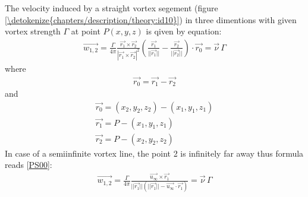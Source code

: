 \documentclass[a4paper,12pt,english]{jupyterBook}
\begin{document}
\sphinxAtStartPar
The velocity induced by a straight vortex segement (figure \hyperref[\detokenize{chapters/description/theory:id10}]{\ref{\detokenize{chapters/description/theory:id10}}}) in three dimentions with given vortex strength \(\Gamma\) at point \(P(x,y,z)\) is qiven by equation:
\begin{equation}\label{equation:chapters/description/theory:q_finite}
\begin{split}
\overrightarrow{w_{1,2}} = \frac{\Gamma}{4\pi}\frac{\overrightarrow{r_1} \times \overrightarrow{r_2}}{|\overrightarrow{r_1} \times \overrightarrow{r_2}|^2} \left(\frac{\overrightarrow{r_1}}{||\overrightarrow{r_1}||} - \frac{\overrightarrow{r_2}}{||\overrightarrow{r_2}||}\right) \cdot\overrightarrow{r_0}=\overrightarrow{\nu}\,\Gamma
\end{split}
\end{equation}
\sphinxAtStartPar
where
\begin{equation*}
\begin{split}
\overrightarrow{r_{0}} = \overrightarrow{r_1} - \overrightarrow{r_2}
\end{split}
\end{equation*}
\sphinxAtStartPar
and
\begin{gather*}
\overrightarrow{r_{0}} = (x_2, y_2, z_2) - (x_1, y_1, z_1) \\
\overrightarrow{r_{1}} = P - (x_1, y_1, z_1)\\
\overrightarrow{r_{2}} = P - (x_2, y_2, z_2)
\end{gather*}
\sphinxAtStartPar
In case of a semi\sphinxhyphen{}infinite vortex line, the point 2 is infinitely far away thus formula reads {[}\hyperlink{cite.chapters/bibliography:id8}{PS00}{]}:
\begin{equation}\label{equation:chapters/description/theory:q_infinite}
\begin{split}
\overrightarrow{w_{1,2}} = \frac{\Gamma}{4\pi}\frac{\overrightarrow{u_\infty} \times \overrightarrow{r_1}}{||\overrightarrow{r_1}||(||\overrightarrow{r_1}|| - \overrightarrow{u_\infty} \cdot \overrightarrow{r_1})}=\overrightarrow{\nu}\,\Gamma
\end{split}
\end{equation}
\end{document}
